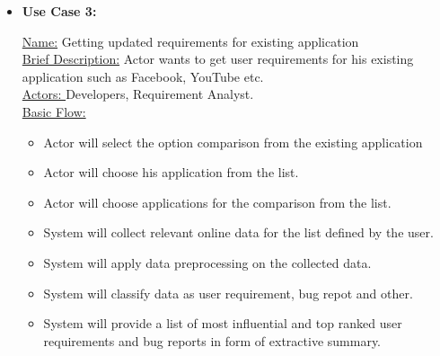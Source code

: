 \begin{itemize}
\item\textbf{ {Use Case 3:\\}}

 \underline {Name:} Getting updated requirements for existing application\\
 \underline{Brief Description:} Actor wants to get user requirements for his existing application such as Facebook, YouTube etc.\\
 \underline{Actors: } Developers, Requirement Analyst.\\
 \underline{Basic Flow:}
\begin {itemize}
\item{Actor will select the option comparison from the existing application}
\item{Actor will choose his application from the list.}
\item{Actor will choose applications for the comparison from the list.}
\item{System will collect relevant online data for the list defined by the user.}
\item{System will apply data preprocessing on the collected data.}
\item{System will classify data as user requirement, bug repot and other.}
\item{System will provide a list of most influential and top ranked user requirements and bug reports in form of extractive summary.}
\end{itemize}

\end{itemize}
